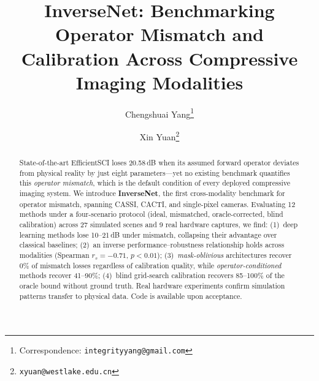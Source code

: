 \documentclass[runningheads]{llncs}
\begin{document}
\title{InverseNet: Benchmarking Operator Mismatch and Calibration Across Compressive Imaging Modalities}

\author{Chengshuai Yang\thanks{Correspondence: \texttt{integrityyang@gmail.com}} \and Xin Yuan\thanks{\texttt{xyuan@westlake.edu.cn}}}

\maketitle

\begin{abstract}
State-of-the-art EfficientSCI loses 20.58\,dB when its assumed forward operator deviates from physical reality by just eight parameters---yet no existing benchmark quantifies this \emph{operator mismatch}, which is the default condition of every deployed compressive imaging system.
We introduce \textbf{InverseNet}, the first cross-modality benchmark for operator mismatch, spanning CASSI, CACTI, and single-pixel cameras.
Evaluating 12 methods under a four-scenario protocol (ideal, mismatched, oracle-corrected, blind calibration) across 27 simulated scenes and 9 real hardware captures, we find: (1)~deep learning methods lose 10--21\,dB under mismatch, collapsing their advantage over classical baselines; (2)~an inverse performance--robustness relationship holds across modalities (Spearman $r_s{=}{-}0.71$, $p{<}0.01$); (3)~\emph{mask-oblivious} architectures recover 0\% of mismatch losses regardless of calibration quality, while \emph{operator-conditioned} methods recover 41--90\%; (4)~blind grid-search calibration recovers 85--100\% of the oracle bound without ground truth.
Real hardware experiments confirm simulation patterns transfer to physical data.
Code is available upon acceptance.

\end{abstract}

\end{document}
